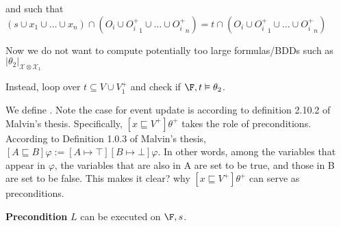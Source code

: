 and such that $(s \cup x_1 \cup \dots \cup x_n) \cap (O_i \cup {O_i^+}_1 \cup \dots \cup {O_i^+}_n) = t \cap (O_i \cup {O_i^+}_1 \cup \dots \cup {O_i^+}_n)$

Now we do not want to compute potentially too large formulas/BDDs such as $|\theta_2|_{\mathcal{X} \otimes \mathcal{X}_1}$

Instead, loop over $t \subseteq V \cup V^+_1$ and check if 
$\F, t \vDash \theta_2$.

\begin{defi}\label{def:alg-checkDEL}
We define . Note the case for event update is according to definition 2.10.2 of Malvin's thesis. Specifically, $[x \sqsubseteq V^+] \theta^+$ takes the role of preconditions.
According to Definition 1.0.3 of Malvin's thesis, $[A \sqsubseteq B] \varphi := [A \mapsto \top][B \mapsto \bot] \varphi$. In other words, among the variables that appear in $\varphi$, the variables that are also in A are set to be true, and those in B are set to be false. This makes it clear? why $[x \sqsubseteq V^+] \theta^+$ can serve as preconditions. 



\begin{algorithm}[H]
\caption{$\chkfcdel$}\label{alg:checkfcDEL}
\textbf{Precondition} $L$ can be executed on $\F,s$.\\


\end{algorithm}
\end{defi}

